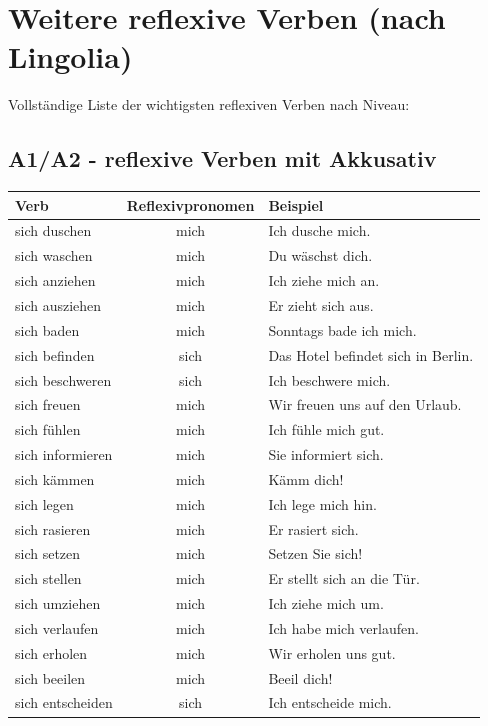 \section{Weitere reflexive Verben (nach Lingolia)}
\label{sec:WeitereReflexiv}

Vollständige Liste der wichtigsten reflexiven Verben nach Niveau:

\subsection*{A1/A2 - reflexive Verben mit Akkusativ}
\begin{center}
\begin{tabular}{|l|c|l|}
\hline
Verb & Reflexivpronomen & Beispiel \\ \hline
sich duschen & mich & Ich dusche mich. \\ \hline
sich waschen & mich & Du wäschst dich. \\ \hline
sich anziehen & mich & Ich ziehe mich an. \\ \hline
sich ausziehen & mich & Er zieht sich aus. \\ \hline
sich baden & mich & Sonntags bade ich mich. \\ \hline
sich befinden & sich & Das Hotel befindet sich in Berlin. \\ \hline
sich beschweren & sich & Ich beschwere mich. \\ \hline
sich freuen & mich & Wir freuen uns auf den Urlaub. \\ \hline
sich fühlen & mich & Ich fühle mich gut. \\ \hline
sich informieren & mich & Sie informiert sich. \\ \hline
sich kämmen & mich & Kämm dich! \\ \hline
sich legen & mich & Ich lege mich hin. \\ \hline
sich rasieren & mich & Er rasiert sich. \\ \hline
sich setzen & mich & Setzen Sie sich! \\ \hline
sich stellen & mich & Er stellt sich an die Tür. \\ \hline
sich umziehen & mich & Ich ziehe mich um. \\ \hline
sich verlaufen & mich & Ich habe mich verlaufen. \\ \hline
sich erholen & mich & Wir erholen uns gut. \\ \hline
sich beeilen & mich & Beeil dich! \\ \hline
sich entscheiden & sich & Ich entscheide mich. \\ \hline
\end{tabular}
\end{center}

